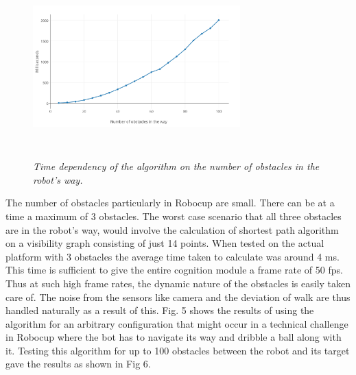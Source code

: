 \documentclass[letterpaper, 10 pt, conference]{ieeeconf}  %
\begin{document}
\begin{figure}[h]  
\begin{center}  
\includegraphics[width=8cm, height = 7cm]{test2.jpg}  
\caption{\small \sl Time dependency of the algorithm on the number of obstacles in the robot's way. \label{fig:test2}}  
\end{center}  
\end{figure}
The number of obstacles particularly in Robocup are small. There can be at a time a maximum of 3 obstacles. The worst case scenario that all three obstacles are in the robot's way, would involve the calculation of shortest path algorithm on a visibility graph consisting of just 14 points. When tested on the actual platform with 3 obstacles the average time taken to calculate was around 4 ms. This time is sufficient to give the entire cognition module a frame rate of 50 fps. Thus at such high frame rates, the dynamic nature of the obstacles is easily taken care of. The noise from the sensors like camera and the deviation of walk are thus handled naturally as a result of this. Fig. 5 shows the results of using the algorithm for an arbitrary configuration that might occur in a technical challenge in Robocup where the bot has to navigate its way and dribble a ball along with it. Testing this algorithm for up to 100 obstacles between the robot and its target gave the results as shown in Fig 6.
 
\end{document}
